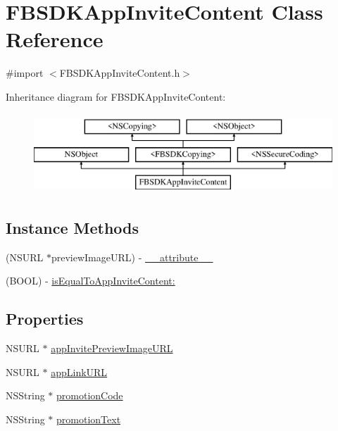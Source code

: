 \hypertarget{interface_f_b_s_d_k_app_invite_content}{}\section{F\+B\+S\+D\+K\+App\+Invite\+Content Class Reference}
\label{interface_f_b_s_d_k_app_invite_content}


{\ttfamily \#import $<$F\+B\+S\+D\+K\+App\+Invite\+Content.\+h$>$}

Inheritance diagram for F\+B\+S\+D\+K\+App\+Invite\+Content\+:\begin{figure}[H]
\begin{center}
\leavevmode
\includegraphics[height=3.000000cm]{interface_f_b_s_d_k_app_invite_content}
\end{center}
\end{figure}
\subsection*{Instance Methods}
\begin{DoxyCompactItemize}
\item 
(N\+S\+U\+R\+L $\ast$preview\+Image\+U\+R\+L) -\/ \hyperlink{interface_f_b_s_d_k_app_invite_content_ad1f24aa00510bb8f3ff4236d56a221bf}{\+\_\+\+\_\+attribute\+\_\+\+\_\+}
\item 
(B\+O\+O\+L) -\/ \hyperlink{interface_f_b_s_d_k_app_invite_content_a297fb76a966893c2c8539b1630173ee5}{is\+Equal\+To\+App\+Invite\+Content\+:}
\end{DoxyCompactItemize}
\subsection*{Properties}
\begin{DoxyCompactItemize}
\item 
N\+S\+U\+R\+L $\ast$ \hyperlink{interface_f_b_s_d_k_app_invite_content_abd30f7f64fe056eda10e0d99f126e64d}{app\+Invite\+Preview\+Image\+U\+R\+L}
\item 
N\+S\+U\+R\+L $\ast$ \hyperlink{interface_f_b_s_d_k_app_invite_content_adfea27af374a17dc3a0565f9d4f7cda8}{app\+Link\+U\+R\+L}
\item 
N\+S\+String $\ast$ \hyperlink{interface_f_b_s_d_k_app_invite_content_a81a509cf0b3a9a67bd7a8bb097e010a9}{promotion\+Code}
\item 
N\+S\+String $\ast$ \hyperlink{interface_f_b_s_d_k_app_invite_content_a39b07d656af61d2f4b5c8c2684b157f9}{promotion\+Text}
\end{DoxyCompactItemize}


